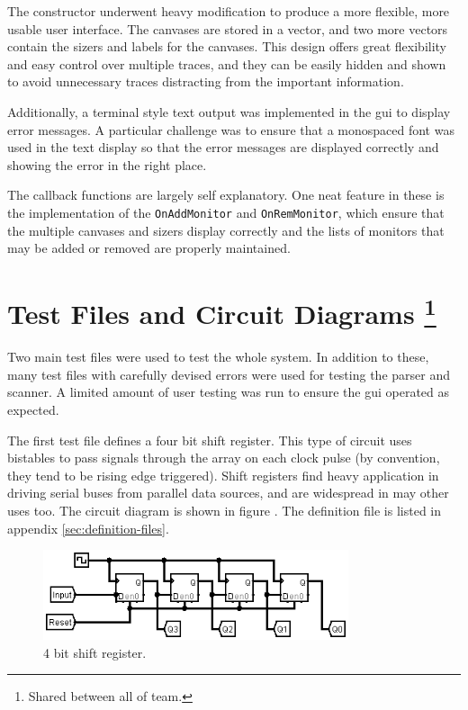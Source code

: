 \documentclass[a4paper,10pt]{article}  %
\begin{document}
The constructor underwent heavy modification to produce a more
flexible, more usable user interface. The canvases are stored in a
vector, and two more vectors contain the sizers and labels for the
canvases. This design offers great flexibility and easy control over
multiple traces, and they can be easily hidden and shown to avoid
unnecessary traces distracting from the important information.

Additionally, a terminal style text output was implemented in the gui
to display error messages. A particular challenge was to ensure that a
monospaced font was used in the text display so that the error
messages are displayed correctly and showing the error in the right
place.

The callback functions are largely self explanatory. One neat feature
in these is the implementation of the \texttt{OnAddMonitor} and
\texttt{OnRemMonitor}, which ensure that the multiple canvases and
sizers display correctly and the lists of monitors that may be added
or removed are properly maintained.

\section{Test Files and Circuit Diagrams \footnote{Shared between all
    of team.}}
\label{sec:test-files-circuit}

Two main test files were used to test the whole system. In addition to
these, many test files with carefully devised errors were used for
testing the parser and scanner. A limited amount of user testing was
run to ensure the gui operated as expected.

The first test file defines a four bit shift register. This type of
circuit uses bistables to pass signals through the array on each clock
pulse (by convention, they tend to be rising edge triggered). Shift
registers find heavy application in driving serial buses from parallel
data sources, and are widespread in may other uses too. The circuit diagram is
shown in figure . The definition file is listed in appendix
\ref{sec:definition-files}.
\begin{figure}[htb]
  \begin{center}
    \includegraphics[width=0.8\textwidth]{shift.png}
  \end{center}
  \caption{4 bit shift register.}
  \label{fig:shiftreg}
\end{figure}
\end{document}
